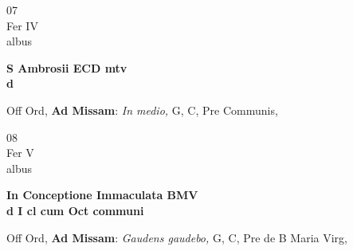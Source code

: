 \documentclass[10pt, openany]{book}
\begin{document}
        \begin{center}
            \begin{minipage}{3.5in}
                \vspace{2em}
                \begin{minipage}{0.5in}
                    {\Huge 07} \\
                    {\normalsize Fer IV} \\
                    {\normalsize albus}
                \end{minipage}
                \begin{minipage}{3.0in}
                    \textbf{ \large S Ambrosii ECD mtv \\
                    \textnormal{\normalsize d}} \\ 
                \end{minipage}
                \begin{justify}Off Ord, \textbf{Ad Missam}: \textit{In medio,} G, C, Pre Communis,  
                \end{justify}
            \end{minipage}
        \end{center}
    
        \begin{center}
            \begin{minipage}{3.5in}
                \vspace{2em}
                \begin{minipage}{0.5in}
                    {\Huge 08} \\
                    {\normalsize Fer V} \\
                    {\normalsize albus}
                \end{minipage}
                \begin{minipage}{3.0in}
                    \textbf{ \large In Conceptione Immaculata BMV \\
                    \textnormal{\normalsize d I cl cum Oct communi}} \\ 
                \end{minipage}
                \begin{justify}Off Ord, \textbf{Ad Missam}: \textit{Gaudens gaudebo,} G, C, Pre de B Maria Virg,  
                \end{justify}
            \end{minipage}
        \end{center}
    
\end{document}
